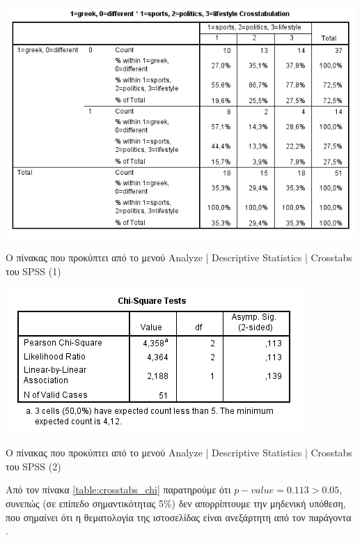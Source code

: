 \documentclass{assignment}
\begin{document}
\begin{Assignment}[Μέρος Β]
\begin{table}[htbp]
\includegraphics[width=\textwidth]{images/table_crosstabs_crosstabulation.png}
\caption{Ο πίνακας που προκύπτει από το μενού Analyze | Descriptive Statistics | Crosstabs του SPSS (1)}
\label{table:crosstabs_crosstabulation}
\end{table}

\begin{table}[htbp]
\includegraphics[width=\textwidth]{images/table_crosstabs_chi.png}
\caption{Ο πίνακας που προκύπτει από το μενού Analyze | Descriptive Statistics | Crosstabs του SPSS (2)}
\label{table:crosstabs_chi}
\end{table}

Από τον πίνακα \ref{table:crosstabs_chi} παρατηρούμε ότι $p-value= 0.113 > 0.05$, συνεπώς (σε επίπεδο σημαντικότητας 5\%) δεν απορρίπτουμε την μηδενική υπόθεση, που σημαίνει ότι η θεματολογία της ιστοσελίδας είναι ανεξάρτητη από τον παράγοντα .

\end{Assignment}

\clearpage
\end{document}
